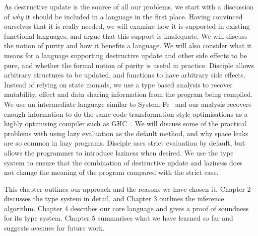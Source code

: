 As destructive update is the source of all our problems, we start with a discussion of \emph{why} it should be included in a language in the first place. Having convinced ourselves that it is really needed, we will examine how it is supported in existing functional languages, and argue that this support is inadequate. We will discuss the notion of purity and how it benefits a language. We will also consider what it means for a language supporting destructive update and other side effects to be pure, and whether the formal notion of purity is useful in practice. Disciple allows arbitrary structures to be updated, and functions to have arbitrary side effects. Instead of relying on state monads, we use a type based analysis to recover mutability, effect and data sharing information from the program being compiled. We use an intermediate language similar to System-Fc~\cite{sulzmann:system-Fc} and our analysis recovers enough information to do the same code transformation style optimisations as a highly optimising compiler such as GHC~\cite{peyton-jones:compilation-by-transformation}. We will discuss some of the practical problems with using lazy evaluation as the default method, and why space leaks are so common in lazy programs. Disciple uses strict evaluation by default, but allows the programmer to introduce laziness when desired. We use the type system to ensure that the combination of destructive update and laziness does not change the meaning of the program compared with the strict case.

This chapter outlines our approach and the reasons we have chosen it. Chapter 2 discusses the type system in detail, and Chapter 3 outlines the inference algorithm. Chapter 4 describes our core language and gives a proof of soundness for its type system. Chapter 5 summarises what we have learned so far and suggests avenues for future work.



